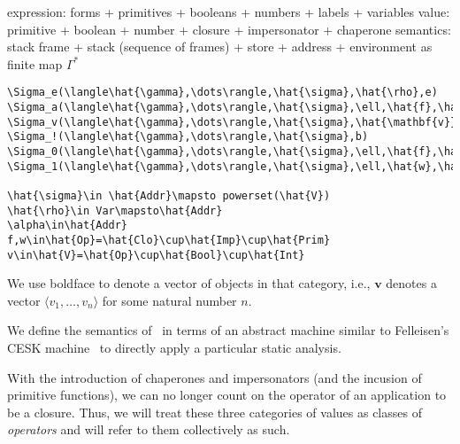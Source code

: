 \documentclass{sigplanconf}
\begin{document}
expression: forms + primitives + booleans + numbers + labels + variables
value: primitive + boolean + number + closure + impersonator + chaperone
semantics: stack frame + stack (sequence of frames) + store + address + environment as finite map
$\Gamma^{*}$

\begin{verbatim}
\Sigma_e(\langle\hat{\gamma},\dots\rangle,\hat{\sigma},\hat{\rho},e)
\Sigma_a(\langle\hat{\gamma},\dots\rangle,\hat{\sigma},\ell,\hat{f},\hat{\mathbf{v}})
\Sigma_v(\langle\hat{\gamma},\dots\rangle,\hat{\sigma},\hat{\mathbf{v}})
\Sigma_!(\langle\hat{\gamma},\dots\rangle,\hat{\sigma},b)
\Sigma_0(\langle\hat{\gamma},\dots\rangle,\hat{\sigma},\ell,\hat{f},\hat{w},\hat{\mathbf{v}})
\Sigma_1(\langle\hat{\gamma},\dots\rangle,\hat{\sigma},\ell,\hat{w},\hat{\mathbf{v}})

\hat{\sigma}\in \hat{Addr}\mapsto powerset(\hat{V})
\hat{\rho}\in Var\mapsto\hat{Addr}
\alpha\in\hat{Addr}
f,w\in\hat{Op}=\hat{Clo}\cup\hat{Imp}\cup\hat{Prim}
v\in\hat{V}=\hat{Op}\cup\hat{Bool}\cup\hat{Int}
\end{verbatim}

We use boldface to denote a vector of objects in that category, i.e., $\mathbf{v}$ denotes a vector $\langle v_1,\dots,v_n\rangle$ for some natural number $n$.

We define the semantics of \chapcalc\ in terms of an abstract machine similar to Felleisen's CESK machine~\cite{felleisen1987calculus} to directly apply a particular static analysis.

With the introduction of chaperones and impersonators (and the incusion of primitive functions), we can no longer count on the operator of an application to be a closure.
Thus, we will treat these three categories of values as classes of \emph{operators} and will refer to them collectively as such.
\end{document}
